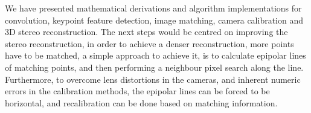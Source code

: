\documentclass[12pt]{article}
\begin{document}
We have presented mathematical derivations and algorithm implementations for convolution, keypoint feature detection, image matching, camera calibration and 3D stereo reconstruction.
The next steps would be centred on improving the stereo reconstruction, in order to achieve a denser reconstruction, more points have to be matched, a simple approach to achieve it, is to calculate epipolar lines of matching points, and then performing a neighbour pixel search along the line.
Furthermore, to overcome lens distortions in the cameras, and inherent numeric errors in the calibration methods, the epipolar lines can be forced to be horizontal, and recalibration can be done based on matching information.



\end{document}
